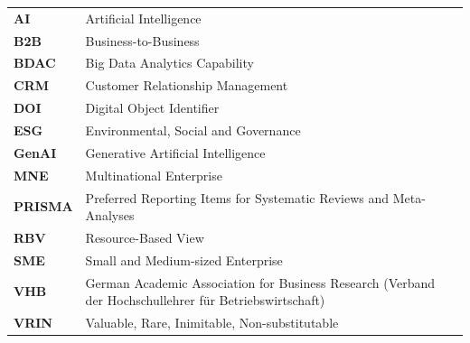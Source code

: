 \documentclass[12pt, oneside]{Thesis} %
\begin{document}
\begin{longtable}{>{\raggedright\arraybackslash}p{2.4cm}>{\raggedright\arraybackslash}p{12.6cm}} %
\textbf{AI} & Artificial Intelligence \\
\textbf{B2B} & Business-to-Business \\
\textbf{BDAC} & Big Data Analytics Capability \\
\textbf{CRM} & Customer Relationship Management \\
\textbf{DOI} & Digital Object Identifier \\
\textbf{ESG} & Environmental, Social and Governance \\
\textbf{GenAI} & Generative Artificial Intelligence \\
\textbf{MNE} & Multinational Enterprise \\
\textbf{PRISMA} & Preferred Reporting Items for Systematic Reviews and Meta-Analyses \\
\textbf{RBV} & Resource-Based View \\
\textbf{SME} & Small and Medium-sized Enterprise \\
\textbf{VHB} & German Academic Association for Business Research (Verband der Hochschullehrer für Betriebswirtschaft) \\
\textbf{VRIN} & Valuable, Rare, Inimitable, Non-substitutable \\
\end{longtable}

\clearpage

\listoffigures %

\listoftables %



\mainmatter %

\pagestyle{fancy} %
\fancyhead[L]{\leftmark}

\end{document}
